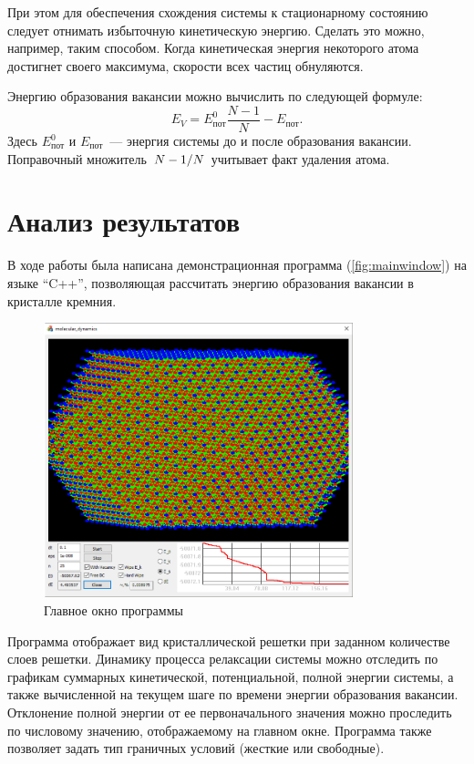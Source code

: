 \documentclass[12pt,a4paper]{article}
\begin{document}
            При этом для обеспечения схождения системы к стационарному состоянию следует отнимать избыточную кинетическую энергию. Сделать это можно, например, таким способом. Когда кинетическая энергия некоторого атома достигнет своего максимума, скорости всех частиц обнуляются.

            Энергию образования вакансии можно вычислить по следующей формуле:
            \begin{equation*}
                E_V = E_\text{пот}^0 \frac{N-1}{N} - E_\text{пот} .
            \end{equation*}
            Здесь $E_\text{пот}^0$ и $E_\text{пот}$~--- энергия системы до и после образования вакансии. Поправочный множитель $\flatfrac{N-1}{N}$ учитывает факт удаления атома.


    \section{Анализ результатов}

        В ходе работы была написана демонстрационная программа (\autoref{fig:mainwindow}) на языке  \enquote{C++}, позволяющая рассчитать энергию образования вакансии в кристалле кремния.
        \begin{figure}[h]
            \centering
            \includegraphics[width=0.8\textwidth]{mainwindow}
            \caption[]{Главное окно программы}
            \label{fig:mainwindow}
        \end{figure}
        Программа отображает вид кристаллической решетки при заданном количестве слоев решетки. Динамику процесса релаксации системы можно отследить по графикам суммарных кинетической, потенциальной, полной энергии системы, а также вычисленной на текущем шаге по времени энергии образования вакансии. Отклонение полной энергии от ее первоначального значения можно проследить по числовому значению, отображаемому на главном окне. Программа также позволяет задать тип граничных условий (жесткие или свободные).
\end{document}
